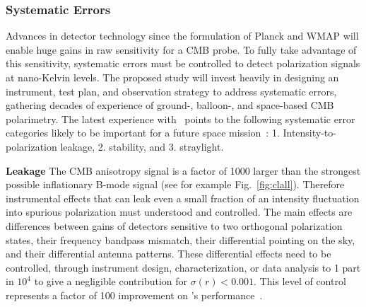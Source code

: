 
\subsubsection{Systematic Errors}
\vspace{-0.05in}

Advances in detector technology since the formulation of Planck and WMAP will enable huge gains in raw 
sensitivity for a CMB probe.  To fully take advantage of this sensitivity, systematic errors must be
controlled to detect polarization signals at nano-Kelvin levels.  The proposed study will invest heavily in 
designing an instrument,  test plan, and observation strategy to address systematic errors,
gathering decades of experience of ground-, balloon-, and space-based CMB polarimetry.  The latest 
experience with \planck\ points to the following systematic error categories likely to be important for a
future space mission~\cite{PlanckintermediateXLVI}:
1. Intensity-to-polarization leakage, 2. stability, and 3. straylight. 


\textbf{Leakage} \hspace{0.1in} The CMB anisotropy signal is a factor of 1000 larger 
than the strongest possible inflationary B-mode signal (see for example Fig.~\ref{fig:clall}). 
Therefore instrumental effects that can leak
even a small fraction of an intensity fluctuation into spurious  polarization
must understood and controlled. The main effects are differences between gains of detectors
sensitive to two orthogonal polarization states, their frequency bandpass mismatch, their differential pointing
on the sky, 
and their differential antenna patterns. These differential effects need to be controlled, through 
instrument design, characterization, or data analysis to 1 part in $10^{4}$ to give a negligible contribution for 
$\sigma(r) <0.001$.  This level of control represents a factor of 100 improvement on \planck 's performance~\cite{PlanckintermediateXLVI}.


